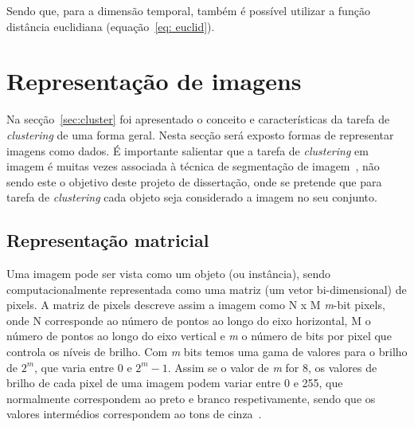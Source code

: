\begin{equation}
\end{equation}

Sendo que, para a dimensão temporal, também é possível utilizar a função distância euclidiana (equação~\ref{eq: euclid}).

%





\section{Representação de imagens} \label{sec:represent}


Na secção~\ref{sec:cluster} foi apresentado o conceito e características da tarefa de \textit{clustering} de uma forma geral. Nesta secção será exposto formas de representar imagens como dados. É importante salientar que a tarefa de \textit{clustering} em imagem é muitas vezes associada à técnica de segmentação de imagem~\citet{Forsyth2011}, não sendo este o objetivo deste projeto de dissertação, onde se pretende que para tarefa de \textit{clustering} cada objeto seja considerado a imagem no seu conjunto. 

\subsection{Representação matricial} \label{subsec:matrix}

Uma imagem pode ser vista como um objeto (ou instância), sendo computacionalmente representada como uma matriz (um vetor bi-dimensional) de pixels. A matriz de pixels descreve assim a imagem como N x M \textit{m}-bit pixels, onde N corresponde ao número de pontos ao longo do eixo horizontal, M o número de pontos ao longo do eixo vertical e \textit{m} o número de bits por pixel que controla os níveis de brilho. Com \textit{m} bits temos uma gama de valores para o brilho de $ 2^m $, que varia entre 0 e $ 2^m - 1 $. Assim se o valor de \textit{m} for 8, os valores de brilho de cada pixel de uma imagem podem variar entre 0 e 255, que normalmente correspondem ao preto e branco respetivamente, sendo que os valores intermédios correspondem ao tons de cinza~\citet{Nixon2002}.

